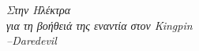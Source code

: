 \thispagestyle{empty}
\phantom{~}
\vspace{40mm}
\begin{flushright}
{\em
Στην Ηλέκτρα\\[1.5\baselineskip]
για τη βοήθειά της εναντία στον Kingpin\\[1.5\baselineskip]
--Daredevil
}
\end{flushright}

\vfill